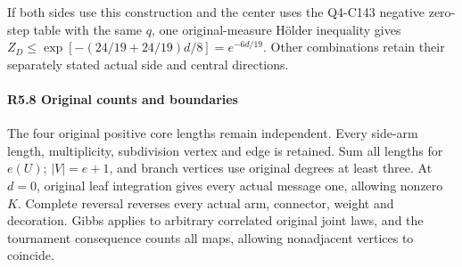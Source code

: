 If both sides use this construction and the center uses the Q4-C143 negative zero-step table with the same \(q\), one original-measure Hölder inequality gives \(Z_D\le\exp[-(24/19+24/19)d/8]=e^{-6d/19}\). Other combinations retain their separately stated actual side and central directions.

\paragraph{R5.8 Original counts and boundaries}

The four original positive core lengths remain independent. Every side-arm length, multiplicity, subdivision vertex and edge is retained. Sum all lengths for \(e(U)\); \(|V|=e+1\), and branch vertices use original degrees at least three. At \(d=0\), original leaf integration gives every actual message one, allowing nonzero \(K\). Complete reversal reverses every actual arm, connector, weight and decoration. Gibbs applies to arbitrary correlated original joint laws, and the tournament consequence counts all maps, allowing nonadjacent vertices to coincide.
